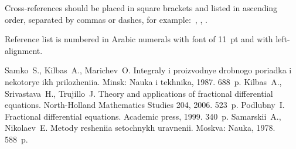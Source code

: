 \documentclass[11pt, oneside, a4paper]{article}
\begin{document}
Cross-references should be placed in square brackets and listed in ascending order, separated 
by commas or dashes, for example:~\cite{stonebraker},
\cite{stonebraker,  amit, cadez}, \cite{yao, amit,cadez}. 

Reference list is numbered in Arabic numerals with font of 11~pt and with left-alignment.

\begin{biblio}
Samko~S., Kilbas~A., Marichev~O. Integraly i proizvodnye drobnogo poriadka i nekotorye ikh prilozheniia. Minsk: Nauka i tekhnika, 1987. 688~p.
Kilbas~A., Srivastava~H., Trujillo~J. Theory and applications of fractional differential equations. North-Holland Mathematics Studies 204, 2006. 523~p.
Podlubny~I. Fractional differential equations. Academic press, 1999. 340~p.
Samarskii~A., Nikolaev~E. Metody resheniia setochnykh uravnenii. Moskva: Nauka, 1978. 588~p.
\end{biblio}
\end{document}
